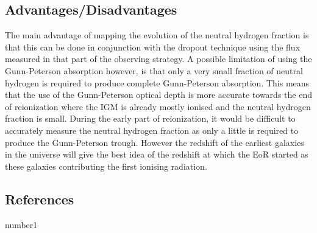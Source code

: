 \documentclass[pdf,color]{UoBnote}
\begin{document}
\subsection{Advantages/Disadvantages}
The main advantage of mapping the evolution of the neutral hydrogen fraction is that this can be done in conjunction with the dropout technique using the flux measured in that part of the observing strategy. A possible limitation of using the Gunn-Peterson absorption however, is that only a very small fraction of neutral hydrogen is required to produce complete Gunn-Peterson absorption. This means that the use of the Gunn-Peterson optical depth is more accurate towards the end of reionization where the IGM is already mostly ionised and the neutral hydrogen fraction is small. During the early part of reionization, it would be difficult to accurately measure the neutral hydrogen fraction as only a little is required to produce the Gunn-Peterson trough. However the redshift of the earliest galaxies in the universe will give the best idea of the redshift at which the EoR started as these galaxies contributing the first ionising radiation.\\ 

\subsection{References}
number1
\end{document}
